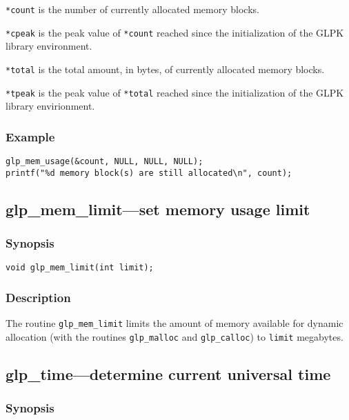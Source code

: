 \verb|*count| is the number of currently allocated memory blocks.

\verb|*cpeak| is the peak value of \verb|*count| reached since the
initialization of the GLPK library environment.

\verb|*total| is the total amount, in bytes, of currently allocated
memory blocks.

\verb|*tpeak| is the peak value of \verb|*total| reached since the
initialization of the GLPK library envirionment.

\subsubsection*{Example}

\begin{footnotesize}
\begin{verbatim}
glp_mem_usage(&count, NULL, NULL, NULL);
printf("%d memory block(s) are still allocated\n", count);
\end{verbatim}
\end{footnotesize}

\subsection{glp\_mem\_limit---set memory usage limit}

\subsubsection*{Synopsis}

\begin{verbatim}
void glp_mem_limit(int limit);
\end{verbatim}

\subsubsection*{Description}

The routine \verb|glp_mem_limit| limits the amount of memory available
for dynamic allocation (with the routines \verb|glp_malloc| and
\verb|glp_calloc|) to \verb|limit| megabytes.

\subsection{glp\_time---determine current universal time}

\subsubsection*{Synopsis}

